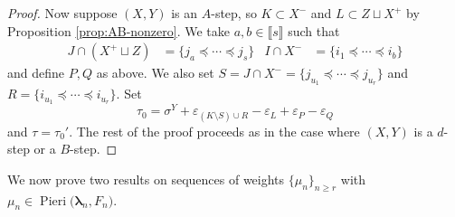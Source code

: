 \documentclass[11pt,fleqn]{amsart}
\renewcommand\epsilon{\varepsilon}
\theoremstyle{definition}
\theoremstyle{remark}
\theoremstyle{remark}
\newcommand\interval[1]{\llbracket{#1}\rrbracket}
\newcommand\wt[1]{\boldsymbol{#1}}
\newcommand\Pieri[2]{\operatorname{Pieri}{(#1},{#2)}}
\begin{document}
\begin{proof}
Now suppose $(X,Y)$ is an $A$-step, so $K \subset X^-$ and $L \subset Z \sqcup 
X^+$ by Proposition \ref{prop:AB-nonzero}. We take $a,b \in \interval s$ such 
that
\begin{align*}
    J \cap (X^+ \sqcup Z) 
    &= \{j_a \preceq \cdots \preceq j_s\} 
  &I \cap X^- 
    &= \{i_1 \preceq \cdots \preceq i_b\}
\end{align*}
and define $P, Q$ as above. We also set $S = J \cap X^- = \{j_{u_1} 
\preceq \cdots \preceq j_{u_r}\}$ and $R = \{i_{u_1} \preceq \cdots \preceq 
i_{u_r}\}$. Set
\[
  \tau_0
    = \sigma^Y + \epsilon_{(K \setminus S) \cup R} - \epsilon_{L} 
      + \epsilon_{P} - \epsilon_{Q}
\]
and $\tau = \tau_0'$. The rest of the proof proceeds as in the case 
where $(X,Y)$ is a $d$-step or a $B$-step.
\end{proof}

We now prove two results on sequences of weights $\{\mu_n\}_{n \geq r}$ 
with $\mu_n \in \Pieri{\wt\lambda_n}{F_n}$.
\end{document}
